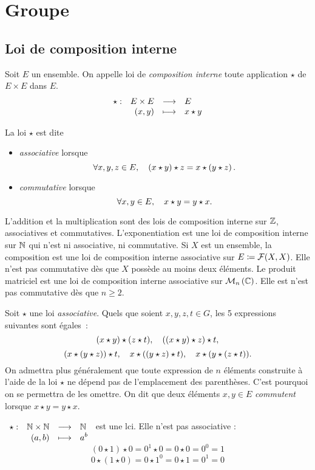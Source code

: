 \documentclass{magnolia}
\begin{document}
\magtoc

\section{Groupe}
\subsection{Loi de composition interne}

\begin{definition}
Soit $E$ un ensemble. On appelle loi de \emph{composition interne} toute
application $\star$ de $E\times E$ dans $E$.
\[\begin{array}[t]{lrcl} \displaystyle{\star} : & \displaystyle{E\times E} & \longrightarrow & \displaystyle{E} \\ & \displaystyle{\left(x,y\right)} & \longmapsto & \displaystyle{x\star y} \end{array}\]
\end{definition}

\begin{definition}
La loi $\star$ est dite
\begin{itemize}
\item \emph{associative} lorsque
  \[\forall x,y,z\in E ,\quad \left(x\star y\right)\star z=x\star\left(y\star z\right).\]
\item \emph{commutative} lorsque
  \[\forall x,y\in E ,\quad x\star y=y\star x.\]
\end{itemize}
\end{definition}

\begin{exemples}
\exemple L'addition et la multiplication sont des lois de composition interne sur $\mathbb{Z}$,
  associatives et commutatives.
\exemple L'exponentiation est une loi de composition interne sur $\mathbb{N}$ qui n'est
  ni associative, ni commutative.
\exemple Si $X$ est un ensemble, la composition est une loi de composition interne
  associative sur $E\coloneqq\mathcal{F}(X,X)$. Elle n'est pas commutative dès que $X$ possède
  au moins deux éléments.
\exemple Le produit matriciel est une loi de composition interne associative sur
  $\mathcal{M}_{n}\left(\mathbb{C}\right)$. Elle est n'est pas commutative dès que $n\geq 2$.
\end{exemples}

\begin{remarques}
\remarque Soit $\star$ une loi \emph{associative}.
  Quels que soient $x, y, z, t\in G$, les 5 expressions
  suivantes sont égales~:
  \[(x\star y)\star(z\star t),\quad ((x\star y)\star z)\star t,\]
  \[(x\star(y\star z))\star t,\quad
    x\star((y\star z)\star t),\quad
    x\star(y\star(z\star t)).\]
  On admettra plus généralement que
  toute expression de $n$ éléments construite à l'aide de la loi $\star$ ne dépend
  pas de l'emplacement des parenthèses. C'est pourquoi on se permettra de les omettre.
\remarque On dit que deux éléments $x,y\in E$ \emph{commutent} lorsque $x\star y=y\star x$.
\end{remarques}
\begin{sol}
$\begin{array}[t]{lrcl} \displaystyle{\star} : & \displaystyle{\mathbb{N}\times\mathbb{N}} & \longrightarrow & \displaystyle{\mathbb{N}} \\ & \displaystyle{(a,b)} & \longmapsto & \displaystyle{a^b} \end{array}$ est une lci. Elle n'est pas associative :
$$(0\star 1)\star 0= 0^1 \star 0=0\star 0=0^0=1$$
$$0\star (1\star 0)=0\star 1^0=0\star 1=0^1=0$$
\end{sol}
\end{document}
